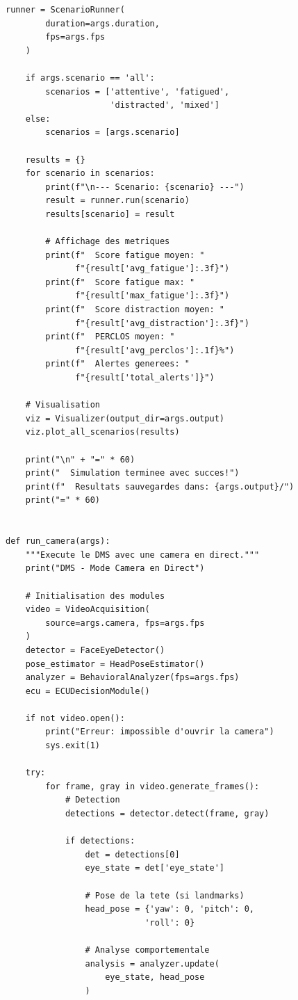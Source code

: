 \documentclass[12pt,a4paper,twoside]{report}
\begin{document}
\begin{lstlisting}[style=pythonstyle, caption={Point d'entrée principal du système DMS.}, label={lst:main}]
    runner = ScenarioRunner(
        duration=args.duration,
        fps=args.fps
    )
    
    if args.scenario == 'all':
        scenarios = ['attentive', 'fatigued', 
                     'distracted', 'mixed']
    else:
        scenarios = [args.scenario]
    
    results = {}
    for scenario in scenarios:
        print(f"\n--- Scenario: {scenario} ---")
        result = runner.run(scenario)
        results[scenario] = result
        
        # Affichage des metriques
        print(f"  Score fatigue moyen: "
              f"{result['avg_fatigue']:.3f}")
        print(f"  Score fatigue max: "
              f"{result['max_fatigue']:.3f}")
        print(f"  Score distraction moyen: "
              f"{result['avg_distraction']:.3f}")
        print(f"  PERCLOS moyen: "
              f"{result['avg_perclos']:.1f}%")
        print(f"  Alertes generees: "
              f"{result['total_alerts']}")
    
    # Visualisation
    viz = Visualizer(output_dir=args.output)
    viz.plot_all_scenarios(results)
    
    print("\n" + "=" * 60)
    print("  Simulation terminee avec succes!")
    print(f"  Resultats sauvegardes dans: {args.output}/")
    print("=" * 60)


def run_camera(args):
    """Execute le DMS avec une camera en direct."""
    print("DMS - Mode Camera en Direct")
    
    # Initialisation des modules
    video = VideoAcquisition(
        source=args.camera, fps=args.fps
    )
    detector = FaceEyeDetector()
    pose_estimator = HeadPoseEstimator()
    analyzer = BehavioralAnalyzer(fps=args.fps)
    ecu = ECUDecisionModule()
    
    if not video.open():
        print("Erreur: impossible d'ouvrir la camera")
        sys.exit(1)
    
    try:
        for frame, gray in video.generate_frames():
            # Detection
            detections = detector.detect(frame, gray)
            
            if detections:
                det = detections[0]
                eye_state = det['eye_state']
                
                # Pose de la tete (si landmarks)
                head_pose = {'yaw': 0, 'pitch': 0, 
                            'roll': 0}
                
                # Analyse comportementale
                analysis = analyzer.update(
                    eye_state, head_pose
                )
                

\end{lstlisting}
\end{document}
